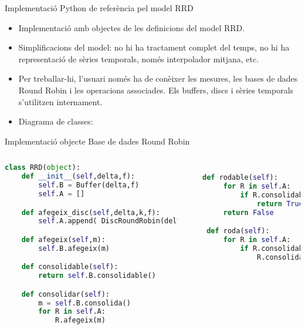 \begin{frame} 
{Implementació Python de referència pel model RRD} 


\begin{itemize}

\item Implementació amb objectes de les definicions del model RRD.

\item Simplificacions del model: no hi ha tractament complet del temps, no hi ha representació de sèries temporals, només interpolador mitjana, etc.

\item Per treballar-hi, l'usuari només ha de conèixer les mesures, les bases de dades Round Robin i les operacions associades. Els buffers, discs i sèries temporals s'utilitzen internament.

\item Diagrama de classes:

\end{itemize}

\begin{center}
       \tiny
       \setlength{\unitlength}{0.2mm}
        
       \normalsize
\end{center}

\end{frame}

\begin{frame}[fragile] 
{Implementació objecte Base de dades Round Robin}

\begin{columns}
\column{6cm}
\begin{lstlisting}[language=python]
class RRD(object):
    def __init__(self,delta,f):
        self.B = Buffer(delta,f)
        self.A = []

    def afegeix_disc(self,delta,k,f):
        self.A.append( DiscRoundRobin(delta,k,f) )

    def afegeix(self,m):
        self.B.afegeix(m)

    def consolidable(self):
        return self.B.consolidable()

    def consolidar(self):
        m = self.B.consolida()
        for R in self.A:
            R.afegeix(m)


\end{lstlisting}

\column{5cm}

\begin{lstlisting}[language=python]

   def rodable(self):
        for R in self.A:
            if R.consolidable():
                return True
        return False

    def roda(self):
        for R in self.A:
            if R.consolidable():
                R.consolida()

\end{lstlisting}

\end{columns}

\end{frame}




